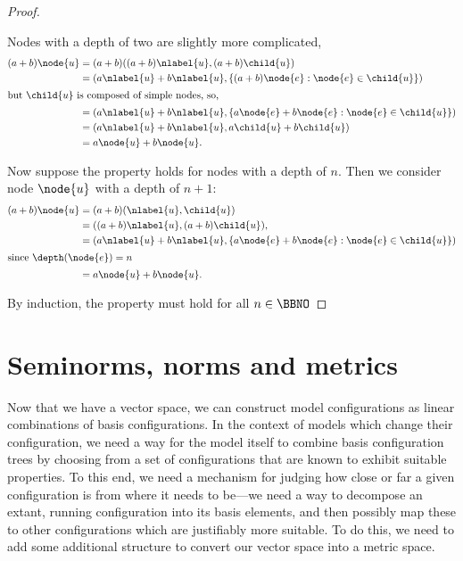 \begin{proposition}
\begin{proof}
\begin{description}
      Nodes with a depth of two are slightly more complicated, 
      \begin{align*}
        (a + b)\node{u} &= (a + b) ((a + b)\nlabel{u}, (a + b)\child{u}) \\
        &= (a\nlabel{u} + b\nlabel{u}, \{(a + b)\node{e}:\node{e}\in\child{u}\}) \\
        \intertext{but $\child{u}$ is composed of simple nodes, so,}
        &= (a\nlabel{u} + b\nlabel{u}, \{a \node{e} + b \node{e}:\node{e}\in\child{u}\}) \\
        &= (a\nlabel{u} + b\nlabel{u}, a\child{u} + b\child{u}) \\
        &= a \node{u} + b\node{u}.
      \end{align*}

      Now suppose the property holds for nodes with a depth of $n$.
      Then we consider node $\node{u}$ with a depth of $n+1$:
      \begin{align*}
        (a + b)\node{u} &= (a + b) (\nlabel{u}, \child{u}) \\
        &= ((a + b)\nlabel{u}, (a + b)\child{u}), \\
        &= (a\nlabel{u} + b\nlabel{u}, \{a \node{e} + b \node{e}:\node{e}\in\child{u}\}) \\
        \intertext{since $\depth(\node{e}) = n$}
        &= a \node{u} + b \node{u}.
      \end{align*}

    \end{description}
    By induction, the property must hold for all $n \in\BBNO$
  \end{proof}
\end{proposition}

\section{Seminorms, norms and metrics} %

Now that we have a vector space, we can construct model configurations
as linear combinations of basis configurations. In the context of
models which change their configuration, we need a way for the model
itself to combine basis configuration trees by choosing from a set of
configurations that are known to exhibit suitable properties.  To this
end, we need a mechanism for judging how close or far a given
configuration is from where it needs to be---we need a way to
decompose an extant, running configuration into its basis elements,
and then possibly map these to other configurations which are
justifiably more suitable.  To do this, we need to add some additional
structure to convert our vector space into a metric space.

